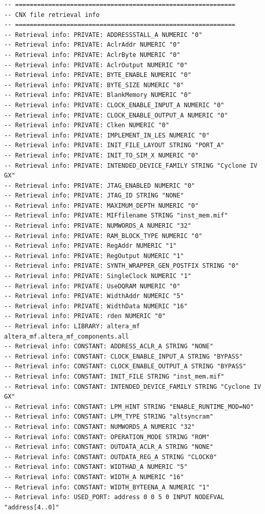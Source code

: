 \documentclass[11pt]{report}
\begin{document}
\begin{spacing}{1.5}
\begin{lstlisting}
-- ============================================================
-- CNX file retrieval info
-- ============================================================
-- Retrieval info: PRIVATE: ADDRESSSTALL_A NUMERIC "0"
-- Retrieval info: PRIVATE: AclrAddr NUMERIC "0"
-- Retrieval info: PRIVATE: AclrByte NUMERIC "0"
-- Retrieval info: PRIVATE: AclrOutput NUMERIC "0"
-- Retrieval info: PRIVATE: BYTE_ENABLE NUMERIC "0"
-- Retrieval info: PRIVATE: BYTE_SIZE NUMERIC "8"
-- Retrieval info: PRIVATE: BlankMemory NUMERIC "0"
-- Retrieval info: PRIVATE: CLOCK_ENABLE_INPUT_A NUMERIC "0"
-- Retrieval info: PRIVATE: CLOCK_ENABLE_OUTPUT_A NUMERIC "0"
-- Retrieval info: PRIVATE: Clken NUMERIC "0"
-- Retrieval info: PRIVATE: IMPLEMENT_IN_LES NUMERIC "0"
-- Retrieval info: PRIVATE: INIT_FILE_LAYOUT STRING "PORT_A"
-- Retrieval info: PRIVATE: INIT_TO_SIM_X NUMERIC "0"
-- Retrieval info: PRIVATE: INTENDED_DEVICE_FAMILY STRING "Cyclone IV GX"
-- Retrieval info: PRIVATE: JTAG_ENABLED NUMERIC "0"
-- Retrieval info: PRIVATE: JTAG_ID STRING "NONE"
-- Retrieval info: PRIVATE: MAXIMUM_DEPTH NUMERIC "0"
-- Retrieval info: PRIVATE: MIFfilename STRING "inst_mem.mif"
-- Retrieval info: PRIVATE: NUMWORDS_A NUMERIC "32"
-- Retrieval info: PRIVATE: RAM_BLOCK_TYPE NUMERIC "0"
-- Retrieval info: PRIVATE: RegAddr NUMERIC "1"
-- Retrieval info: PRIVATE: RegOutput NUMERIC "1"
-- Retrieval info: PRIVATE: SYNTH_WRAPPER_GEN_POSTFIX STRING "0"
-- Retrieval info: PRIVATE: SingleClock NUMERIC "1"
-- Retrieval info: PRIVATE: UseDQRAM NUMERIC "0"
-- Retrieval info: PRIVATE: WidthAddr NUMERIC "5"
-- Retrieval info: PRIVATE: WidthData NUMERIC "16"
-- Retrieval info: PRIVATE: rden NUMERIC "0"
-- Retrieval info: LIBRARY: altera_mf altera_mf.altera_mf_components.all
-- Retrieval info: CONSTANT: ADDRESS_ACLR_A STRING "NONE"
-- Retrieval info: CONSTANT: CLOCK_ENABLE_INPUT_A STRING "BYPASS"
-- Retrieval info: CONSTANT: CLOCK_ENABLE_OUTPUT_A STRING "BYPASS"
-- Retrieval info: CONSTANT: INIT_FILE STRING "inst_mem.mif"
-- Retrieval info: CONSTANT: INTENDED_DEVICE_FAMILY STRING "Cyclone IV GX"
-- Retrieval info: CONSTANT: LPM_HINT STRING "ENABLE_RUNTIME_MOD=NO"
-- Retrieval info: CONSTANT: LPM_TYPE STRING "altsyncram"
-- Retrieval info: CONSTANT: NUMWORDS_A NUMERIC "32"
-- Retrieval info: CONSTANT: OPERATION_MODE STRING "ROM"
-- Retrieval info: CONSTANT: OUTDATA_ACLR_A STRING "NONE"
-- Retrieval info: CONSTANT: OUTDATA_REG_A STRING "CLOCK0"
-- Retrieval info: CONSTANT: WIDTHAD_A NUMERIC "5"
-- Retrieval info: CONSTANT: WIDTH_A NUMERIC "16"
-- Retrieval info: CONSTANT: WIDTH_BYTEENA_A NUMERIC "1"
-- Retrieval info: USED_PORT: address 0 0 5 0 INPUT NODEFVAL "address[4..0]"

\end{lstlisting}
\end{spacing}
\end{document}
